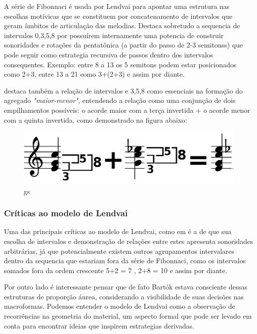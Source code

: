 \documentclass[
	12pt,				%
	openright,			%
	twoside,			%
	a4paper,			%
	english,			%
	french,				%
	spanish,			%
	brazil				%
	]{abntex2}
\begin{document}
A série de Fibonnaci é usada por Lendvai para apontar uma estrutura nas escolhas motívicas que se constituem por concatenamento de intervalos que geram âmbitos de articulação das melodias. Destaca sobretudo a sequencia de intervalos 0,3,5,8 por possuírem internamente uma potencia de construir sonoridades e rotações da pentatônica (a partir do passo de 2-3 semitonss) que pode seguir como estrategia recursiva de passos dentro dos intervalos consequentes. Exemplo: entre 8 a 13 os 5 semitons podem estar posicionados como 2+3, entre 13 a 21 como 3+(2+3) e assim por diante.

 destaca também a relação de intervalos e 3,5,8 como essenciais na formação do agregado \textit{"maior-menor"}, entendendo a relação como uma conjunção de dois empilhamentos possíveis: o acorde maior com a terça invertida + o acorde menor com a quinta invertida, como demonstrado na figura abaixo:

\begin{figure}[!h]
	\caption{\label{fig_grafico}gs  }
	\begin{center}
	    \includegraphics[scale=0.3]{axis/GS_maior_menor.png}
	\end{center}
\end{figure} 



\subsubsection{Críticas ao modelo de Lendvai}

Uma das principais críticas ao modelo de Lendvai, como em  é a de que sua escolha de intervalos e demonstração de relações entre estes apresenta sonoridades arbitrárias, já que potencialmente existem outros agrupamentos intervalares dentro da sequencia que estariam fora da série de Fibonnaci, como os intervalos somados fora da ordem crescente 5+2 = 7 , 2+8 = 10 e assim por diante.

Por outro lado é interessante pensar que de fato Bartók estava consciente dessas estruturas de proporção áurea, considerando a visibilidade de suas decisões nas macroformas. Podemos entender o modelo de Lendvai como a observação de recorrências na geometria do material, um aspecto formal que pode ser levado em conta para encontrar ideias que inspirem estrategias derivadas.
\end{document}
